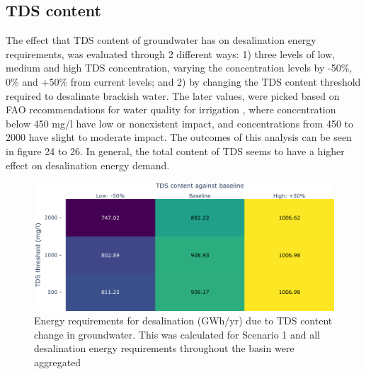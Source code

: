 \documentclass[12pt]{iopart}
\begin{document}
\subsection{TDS content}
The effect that TDS content of groundwater has on desalination energy requirements, was evaluated through 2 different ways: 1) three levels of low, medium and high TDS concentration, varying the concentration levels by -50\%, 0\% and +50\% from current levels; and 2) by changing the TDS content threshold required to desalinate brackish water. The later values, were picked based on FAO recommendations for water quality for irrigation \cite{fao1985water}, where concentration below 450 mg/l have low or nonexistent impact, and concentrations from 450 to 2000 have slight to moderate impact. The outcomes of this analysis can be seen in figure 24 to 26. In general, the total content of TDS seems to have a higher effect on desalination energy demand.

\begin{figure}[!h]
	\centering
	\includegraphics[width=\textwidth]{TDSSensitivityAll}
	\caption{Energy requirements for desalination (GWh/yr) due to TDS content change in groundwater. This was calculated for Scenario 1 and all desalination energy requirements throughout the basin were aggregated}
	\label{fig:tdssensall}
\end{figure} 
\newpage
\end{document}
